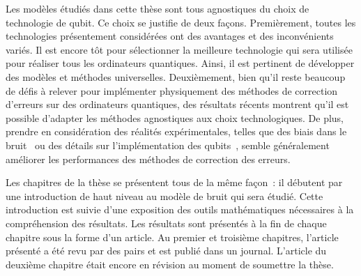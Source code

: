 Les modèles étudiés dans cette thèse sont tous agnostiques du choix de technologie de qubit.
Ce choix se justifie de deux façons.
Premièrement,
toutes les technologies présentement considérées ont des avantages et des inconvénients variés.
Il est encore tôt pour sélectionner la meilleure technologie qui sera utilisée pour réaliser
tous les ordinateurs quantiques.
Ainsi, il est pertinent de développer des modèles et méthodes universelles.
Deuxièmement,
bien qu'il reste beaucoup de défis à relever pour implémenter physiquement des méthodes
de correction d'erreurs sur des ordinateurs quantiques,
des résultats récents montrent qu'il est possible d'adapter les méthodes agnostiques
aux choix technologiques.
De plus,
prendre en considération des réalités expérimentales,
telles que des biais dans le bruit~\cite{tuckett_ultrahigh_2018}
ou des détails sur l'implémentation des qubits~\cite{noh_fault-tolerant_2020, darmawan_practical_2021},
semble généralement améliorer les performances des méthodes de correction des erreurs.

Les chapitres de la thèse se présentent tous de la même façon~:
il débutent par une introduction de haut niveau au modèle de bruit qui sera étudié.
Cette introduction est suivie d'une exposition des outils mathématiques nécessaires à
la compréhension des résultats.
Les résultats sont présentés à la fin de chaque chapitre sous la forme d'un article.
Au premier et troisième chapitres,
l'article présenté a été revu par des pairs et est publié dans un journal.
L'article du deuxième chapitre était encore en révision au moment de soumettre la thèse.